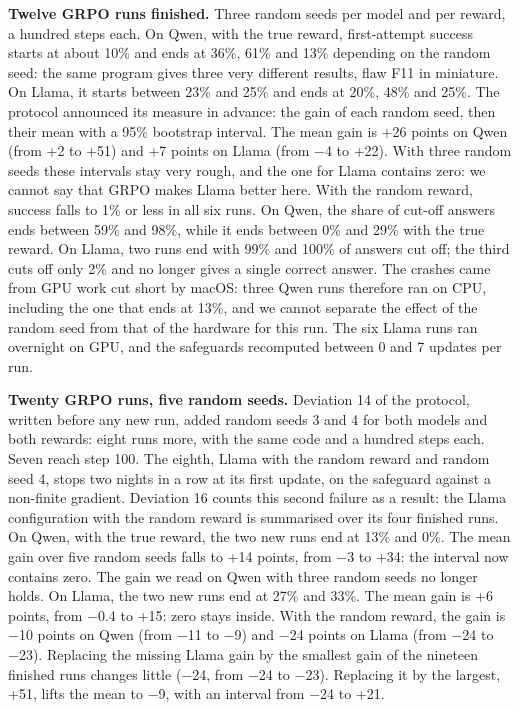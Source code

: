 \documentclass[11pt,a4paper]{article}
\begin{document}
\textbf{Twelve GRPO runs finished.} Three random seeds per model and per
reward, a hundred steps each. On Qwen, with the true reward,
first-attempt success starts at about 10\% and ends at 36\%, 61\% and
13\% depending on the random seed: the same program gives three very
different results, flaw F11 in miniature. On Llama, it starts between
23\% and 25\% and ends at 20\%, 48\% and 25\%. The protocol announced
its measure in advance: the gain of each random seed, then their mean
with a 95\% bootstrap interval. The mean gain is +26 points on Qwen
(from +2 to +51) and +7 points on Llama (from −4 to +22). With three
random seeds these intervals stay very rough, and the one for Llama
contains zero: we cannot say that GRPO makes Llama better here. With the
random reward, success falls to 1\% or less in all six runs. On Qwen,
the share of cut-off answers ends between 59\% and 98\%, while it ends
between 0\% and 29\% with the true reward. On Llama, two runs end with
99\% and 100\% of answers cut off; the third cuts off only 2\% and no
longer gives a single correct answer. The crashes came from GPU work cut
short by macOS: three Qwen runs therefore ran on CPU, including the one
that ends at 13\%, and we cannot separate the effect of the random seed
from that of the hardware for this run. The six Llama runs ran overnight
on GPU, and the safeguards recomputed between 0 and 7 updates per run.

\textbf{Twenty GRPO runs, five random seeds.} Deviation 14 of the
protocol, written before any new run, added random seeds 3 and 4 for
both models and both rewards: eight runs more, with the same code and a
hundred steps each. Seven reach step 100. The eighth, Llama with the
random reward and random seed 4, stops two nights in a row at its first
update, on the safeguard against a non-finite gradient. Deviation 16
counts this second failure as a result: the Llama configuration with the
random reward is summarised over its four finished runs. On Qwen, with
the true reward, the two new runs end at 13\% and 0\%. The mean gain
over five random seeds falls to +14 points, from −3 to +34: the interval
now contains zero. The gain we read on Qwen with three random seeds no
longer holds. On Llama, the two new runs end at 27\% and 33\%. The mean
gain is +6 points, from −0.4 to +15: zero stays inside. With the random
reward, the gain is −10 points on Qwen (from −11 to −9) and −24 points
on Llama (from −24 to −23). Replacing the missing Llama gain by the
smallest gain of the nineteen finished runs changes little (−24, from
−24 to −23). Replacing it by the largest, +51, lifts the mean to −9,
with an interval from −24 to +21.
\end{document}
